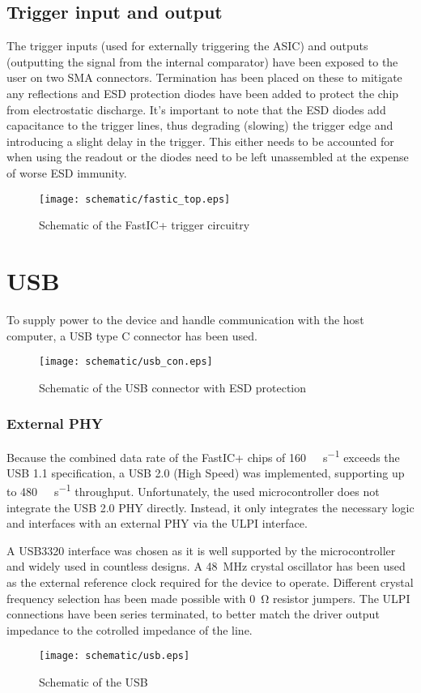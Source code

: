 \subsection{Trigger input and output}
The trigger inputs (used for externally triggering the ASIC) and outputs (outputting the signal from the internal comparator) have been exposed to the user on two SMA connectors. Termination has been placed on these to mitigate any reflections and ESD protection diodes have been added to protect the chip from electrostatic discharge. It's important to note that the ESD diodes add capacitance to the trigger lines, thus degrading (slowing) the trigger edge and introducing a slight delay in the trigger. This either needs to be accounted for when using the readout or the diodes need to be left unassembled at the expense of worse ESD immunity. 
%
\FloatBarrier
\begin{figure}[htp!]
    \centering
    \texttt{[image: schematic/fastic\_top.eps]}
    \caption{Schematic of the FastIC+ trigger circuitry}
    \label{fig:schem_fastic_triggers}
\end{figure}
\FloatBarrier

\section{USB}
To supply power to the device and handle communication with the host computer, a USB type C connector has been used.
\FloatBarrier
\begin{figure}[htp!]
    \centering
    \texttt{[image: schematic/usb\_con.eps]}
    \caption{Schematic of the USB connector with ESD protection}
    \label{fig:schem_usb_con}
\end{figure}
\FloatBarrier
\subsubsection{External PHY}
Because the combined data rate of the FastIC+ chips of \SI{160}{\mega\bit\per\second} exceeds the USB 1.1 specification, a USB 2.0 (High Speed) was implemented, supporting up to \SI{480}{\mega\bit\per\second} throughput. Unfortunately, the used microcontroller does not integrate the USB 2.0 PHY directly. Instead, it only integrates the necessary logic and interfaces with an external PHY via the ULPI interface. 


A USB3320 interface was chosen as it is well supported by the microcontroller and widely used in countless designs. A \SI{48}{\mega\hertz} crystal oscillator has been used as the external reference clock required for the device to operate. Different crystal frequency selection has been made possible with \SI{0}{\ohm} resistor jumpers. The ULPI connections have been series terminated, to better match the driver output impedance to the cotrolled impedance of the line. 
\FloatBarrier
\begin{figure}[htp!]
    \centering
    \texttt{[image: schematic/usb.eps]}
    \caption{Schematic of the USB}
    \label{fig:schem_usb}
\end{figure}
\FloatBarrier
